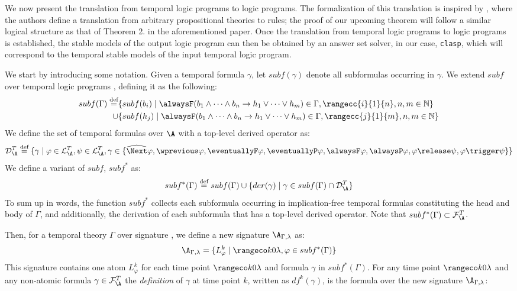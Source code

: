 We now present the translation from temporal logic programs to logic
programs. The formalization of this translation is inspired by
\cite[p. 9]{capeva05a}, where the authors define a translation from
arbitrary propositional theories to rules; the proof of our upcoming
theorem will follow a similar logical structure as that of Theorem
2. in the aforementioned paper. Once the translation from temporal
logic programs to logic programs is established, the stable models of
the output logic program can then be obtained by an answer set solver,
in our case, \verb|clasp|, which will correspond to the temporal
stable models of the input temporal logic program.

We start by introducing some notation. 
Given a temporal formula $\gamma$, let $subf(\gamma)$ denote all
subformulas occurring in $\gamma$. We extend $subf$ over temporal
logic programs , defining it as the following:
\begin{align*}
subf(\Gamma) \defeq &\{ subf(b_i) \mid \temprulelong \in \Gamma, \rangecc{i}{1}{n}, n,m \in \mathbb{N} \}\\
  \cup &\{ subf(h_j) \mid \temprulelong \in \Gamma,\rangecc{j}{1}{m}, n,m \in \mathbb{N} \}
\end{align*}
We define the set of temporal formulas over $\A$ with a top-level
derived operator as:
$$
\mathcal{D}_{\A}^{T} \defeq \{ \gamma \mid \varphi \in
\mathcal{L}_{\A}^{T}, \psi \in \mathcal{L}_{\A}^{T}, 
\gamma \in \{ \wnext\varphi, \wprevious\varphi, \eventuallyF\varphi,
              \eventuallyP\varphi, \alwaysF\varphi, \alwaysP\varphi, \varphi
              \release \psi, \varphi \trigger \psi \} \}
$$
We define a variant of $subf$, $subf^*$ as:
$$
subf^*(\Gamma) \defeq subf(\Gamma) \cup \{ der(\gamma) \mid \gamma \in subf(\Gamma) \cap \mathcal{D}_{\A}^{T} \}\\
$$
To sum up in words, the function $subf^*$ collects each subformula
occurring in implication-free temporal formulas constituting the head
and body of $\Gamma$, and additionally, the derivation of each
subformula that has a top-level derived operator. Note that
$subf^*(\Gamma) \subset \mathcal{F}_{\A}^{T}$.

Then, for a temporal theory $\Gamma$ over signature \A, we define a
new signature $\A_{\Gamma,\lambda}$ as:
$$
\A_{\Gamma,\lambda} = \{ L_{\varphi}^k \mid \kinlambda, \varphi \in subf^*(\Gamma) \}
$$
This signature contains one atom $L_\varphi^k$ for each time point
$\kinlambda$ and formula $\gamma$ in $subf^*(\Gamma)$. For any time
point $\kinlambda$ and any non-atomic formula
$\gamma \in \mathcal{F}_\A^T$ the \emph{definition} of $\gamma$ at
time point $k$, written as $df^k(\gamma)$, is the formula over the new
signature $\A_{\Gamma,\lambda}$:

